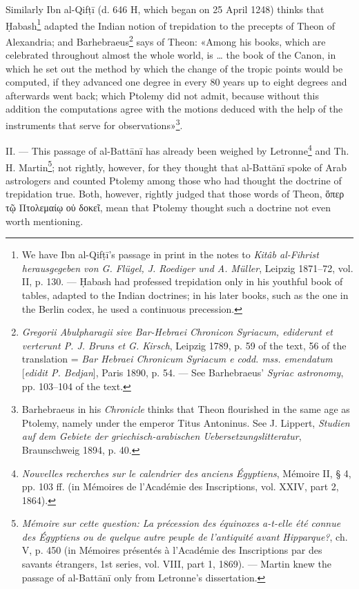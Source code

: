 \documentclass[11pt]{article}
\newcommand{\Pg}[1]{\marginpar{\footnotesize\color{gray}#1}}
\begin{document}
\par Similarly Ibn al-Qifṭī (d. 646 H, which began on 25 April 1248) thinks that Ḥabash\footnote{We have Ibn al-Qifṭī's passage in print in the notes to \emph{Kitâb al-Fihrist herausgegeben von G. Flügel, J. Roediger und A. Müller}, Leipzig 1871–72, vol. II, p. 130. — Ḥabash had professed trepidation only in his youthful book of tables, adapted to the Indian doctrines; in his later books, such as the one in the Berlin codex, he used a continuous precession.} adapted the Indian notion of trepidation to the precepts of Theon of Alexandria; and Barhebraeus\footnote{\emph{Gregorii Abulpharagii sive Bar-Hebraei Chronicon Syriacum, ediderunt et verterunt P. J. Bruns et G. Kirsch}, Leipzig 1789, p. 59 of the text, 56 of the translation = \emph{Bar Hebraei Chronicum Syriacum e codd. mss. emendatum} [\emph{edidit P. Bedjan}], Paris 1890, p. 54. — See Barhebraeus' \emph{Syriac astronomy}, pp. 103–104 of the text.} says of Theon: «Among his books, which are celebrated throughout almost the whole world, is … the book of the Canon, in which he set out the method by which the change of the tropic points would be computed, if they advanced one degree in every 80 years up to eight degrees and afterwards went back; which Ptolemy did not admit, because without this addition the computations agree with the motions deduced with the help of the instruments that serve for observations»\footnote{Barhebraeus in his \emph{Chronicle} thinks that Theon flourished in the same age as Ptolemy, namely under the emperor Titus Antoninus. See J. Lippert, \emph{Studien auf dem Gebiete der griechisch-arabischen Uebersetzungslitteratur}, Braunschweig 1894, p. 40.}.\par
\par \Pg{I 300}II. — This passage of al-Battānī has already been weighed by Letronne\footnote{\emph{Nouvelles recherches sur le calendrier des anciens Égyptiens}, Mémoire II, § 4, pp. 103 ff. (in Mémoires de l'Académie des Inscriptions, vol. XXIV, part 2, 1864).} and Th. H. Martin\footnote{\emph{Mémoire sur cette question: La précession des équinoxes a-t-elle été connue des Égyptiens ou de quelque autre peuple de l'antiquité avant Hipparque?}, ch. V, p. 450 (in Mémoires présentés à l'Académie des Inscriptions par des savants étrangers, 1st series, vol. VIII, part 1, 1869). — Martin knew the passage of al-Battānī only from Letronne's dissertation.}; not rightly, however, for they thought that al-Battānī spoke of Arab astrologers and counted Ptolemy among those who had thought the doctrine of trepidation true. Both, however, rightly judged that those words of Theon, {\greekfont ὅπερ τῷ Πτολεμαίῳ οὐ δοκεῖ}, mean that Ptolemy thought such a doctrine not even worth mentioning.\par
\end{document}
